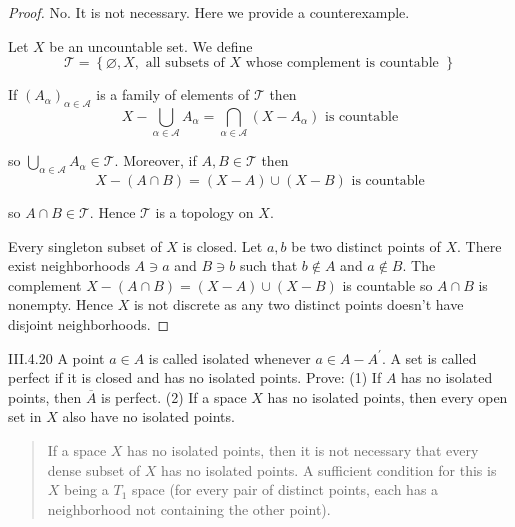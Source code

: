 \begin{proof}
	No. It is not necessary. Here we provide a counterexample.

	Let \(X\) be an uncountable set. We define
	\[
		\mathscr{T} = \left\{ \varnothing, X, \text{ all subsets of \(X\) whose complement is countable } \right\}
	\]

	If \( {(A_{\alpha})}_{\alpha\in \mathscr{A}} \) is a family of elements of \( \mathscr{T} \) then
	\[
		X - \bigcup_{\alpha\in\mathscr{A}} A_{\alpha} = \bigcap_{\alpha\in\mathscr{A}}(X - A_{\alpha}) \text{ is countable}
	\]

	so \( \bigcup_{\alpha\in\mathscr{A}} A_{\alpha} \in \mathscr{T} \). Moreover, if \( A, B \in \mathscr{T} \) then
	\[
		X - (A \cap B) = (X - A) \cup (X - B) \text{ is countable}
	\]

	so \( A \cap B \in \mathscr{T} \). Hence \( \mathscr{T} \) is a topology on \(X\).

	Every singleton subset of \(X\) is closed. Let \(a, b\) be two distinct points of \(X\). There exist neighborhoods \(A \ni a\) and \(B \ni b\) such that \(b \notin A\) and \(a \notin B\). The complement \( X - (A \cap B) = (X - A) \cup (X - B) \) is countable so \( A \cap B \) is nonempty. Hence \( X \) is not discrete as any two distinct points doesn't have disjoint neighborhoods.
\end{proof}

\begin{problem}{III.4.20}
A point \(a \in A\) is called isolated whenever \(a \in A - A^{\prime}\). A set is called perfect if it is closed and has no isolated points. Prove: (1) If \(A\) has no isolated points, then \(\overline{A}\) is perfect. (2) If a space \(X\) has no isolated points, then every open set in \(X\) also have no isolated points.
\end{problem}

\begin{quotation}
	If a space \(X\) has no isolated points, then it is not necessary that every dense subset of \(X\) has no isolated points. A sufficient condition for this is \(X\) being a \(T_{1}\) space (for every pair of distinct points, each has a neighborhood not containing the other point).
\end{quotation}

